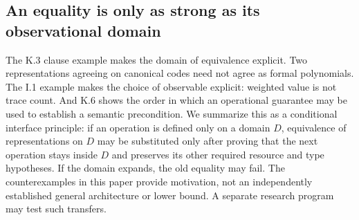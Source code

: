 \documentclass[11pt,letterpaper]{article}
\theoremstyle{definition}\newtheorem{definition}[theorem]{Definition}\newtheorem{example}[theorem]{Example}
\theoremstyle{remark}\newtheorem{remark}[theorem]{Remark}
\begin{document}
\subsection{An equality is only as strong as its observational domain}
The K.3 clause example makes the domain of equivalence explicit. Two representations agreeing on canonical codes need not agree as formal polynomials. The I.1 example makes the choice of observable explicit: weighted value is not trace count. And K.6 shows the order in which an operational guarantee may be used to establish a semantic precondition. We summarize this as a conditional interface principle: if an operation is defined only on a domain $D$, equivalence of representations on $D$ may be substituted only after proving that the next operation stays inside $D$ and preserves its other required resource and type hypotheses. If the domain expands, the old equality may fail. The counterexamples in this paper provide motivation, not an independently established general architecture or lower bound. A separate research program may test such transfers.
\end{document}
